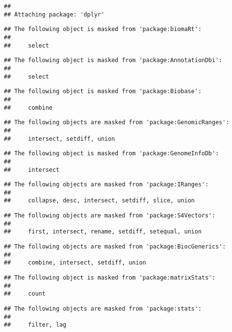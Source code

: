 \documentclass[
]{article}
\begin{document}
\begin{verbatim}
## 
## Attaching package: 'dplyr'
\end{verbatim}

\begin{verbatim}
## The following object is masked from 'package:biomaRt':
## 
##     select
\end{verbatim}

\begin{verbatim}
## The following object is masked from 'package:AnnotationDbi':
## 
##     select
\end{verbatim}

\begin{verbatim}
## The following object is masked from 'package:Biobase':
## 
##     combine
\end{verbatim}

\begin{verbatim}
## The following objects are masked from 'package:GenomicRanges':
## 
##     intersect, setdiff, union
\end{verbatim}

\begin{verbatim}
## The following object is masked from 'package:GenomeInfoDb':
## 
##     intersect
\end{verbatim}

\begin{verbatim}
## The following objects are masked from 'package:IRanges':
## 
##     collapse, desc, intersect, setdiff, slice, union
\end{verbatim}

\begin{verbatim}
## The following objects are masked from 'package:S4Vectors':
## 
##     first, intersect, rename, setdiff, setequal, union
\end{verbatim}

\begin{verbatim}
## The following objects are masked from 'package:BiocGenerics':
## 
##     combine, intersect, setdiff, union
\end{verbatim}

\begin{verbatim}
## The following object is masked from 'package:matrixStats':
## 
##     count
\end{verbatim}

\begin{verbatim}
## The following objects are masked from 'package:stats':
## 
##     filter, lag
\end{verbatim}
\end{document}
